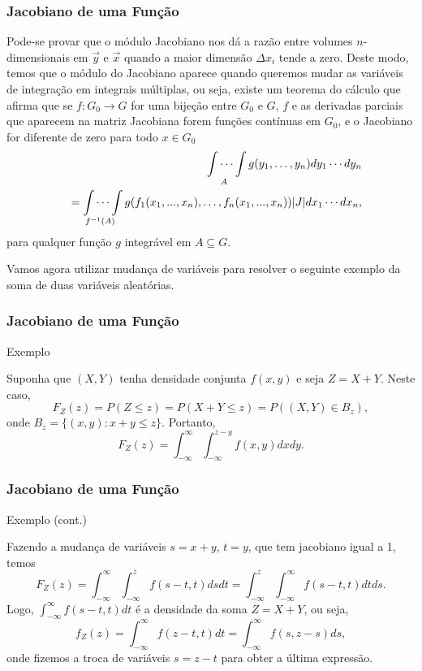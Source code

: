 \begin{frame}
\frametitle{\textbf{Jacobiano de uma Função}}
\baselineskip=13pt
\begin{block}{}


Pode-se provar que o módulo Jacobiano nos dá a razão entre volumes $n$-dimensionais em $\vec{y}$ e $\vec{x}$ quando a maior dimensão $\Delta x_i$ tende a zero. Deste modo, temos que o módulo do Jacobiano aparece quando queremos mudar as variáveis de integração em integrais múltiplas, ou seja, existe um teorema do cálculo que afirma que se $f:G_0\rightarrow G$ for uma bijeção entre $G_0$ e $G$, $f$ e as derivadas parciais que aparecem na matriz Jacobiana forem funções contínuas em $G_0$, e o Jacobiano for diferente de zero para todo $x\in G_0$
\begin{eqnarray}
& & \idotsint\limits_A g(y_1,\ldots,y_n)dy_1\cdots dy_n\nonumber \\
& & =\idotsint\limits_{f^{-1}(A)} g(f_1(x_1,...,x_n),\ldots,f_n(x_1,...,x_n))|J|dx_1\cdots dx_n,\nonumber
\end{eqnarray}
para qualquer função $g$ integrável em $A\subseteq G$.

Vamos agora utilizar mudança de variáveis para resolver o seguinte exemplo da soma de duas variáveis aleatórias.

\end{block}
\end{frame}

\begin{frame}
\frametitle{\textbf{Jacobiano de uma Função}}
\baselineskip=13pt
\begin{block}{Exemplo}



Suponha que $(X,Y)$ tenha densidade conjunta $f(x,y)$ e seja $Z=X+Y$. Neste caso,
$$F_Z(z)=P(Z\leq z)=P(X+Y\leq z)=P((X,Y)\in B_z),$$
onde $B_z=\{(x,y):x+y\leq z\}$. Portanto,
$$F_Z(z)=\int_{-\infty}^{\infty}\int_{-\infty}^{z-y}f(x,y)dxdy.$$

\end{block}
\end{frame}

\begin{frame}
\frametitle{\textbf{Jacobiano de uma Função}}
\baselineskip=13pt
\begin{block}{Exemplo (cont.)}


Fazendo a mudança de variáveis $s=x+y$, $t=y$, que tem jacobiano igual a 1, temos
$$F_Z(z)=\int_{-\infty}^{\infty}\int_{-\infty}^{z}f(s-t,t)dsdt=\int_{-\infty}^{z}\int_{-\infty}^{\infty}f(s-t,t)dtds.$$
Logo, $\int_{-\infty}^{\infty}f(s-t,t)dt$ é a densidade da soma $Z=X+Y$, ou seja,
$$f_Z(z)=\int_{-\infty}^{\infty}f(z-t,t)dt=\int_{-\infty}^{\infty}f(s,z-s)ds,$$
onde fizemos a troca de variáveis $s=z-t$ para obter a última expressão.

\end{block}
\end{frame}

